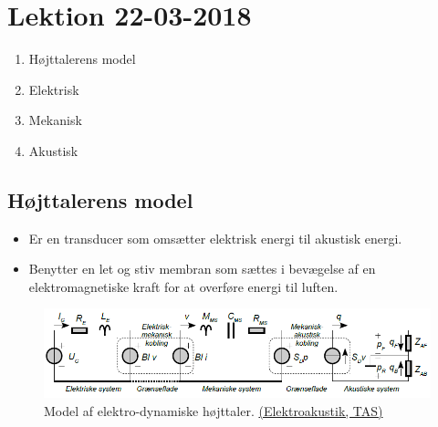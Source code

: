 \section{Lektion 22-03-2018}

\begin{enumerate}
	\item Højttalerens model
	\item Elektrisk
	\item Mekanisk
	\item Akustisk
\end{enumerate}

\noindent{} \vspace{3mm}

\subsection{Højttalerens model}
\begin{itemize}
	\item Er en transducer som omsætter elektrisk energi til akustisk energi.
	\item Benytter en let og stiv membran som sættes i bevægelse af en elektromagnetiske kraft for at overføre energi til luften.
\end{itemize}

\begin{figure} [H]
	\centering
	\includegraphics[width=\linewidth]{graphics/30.png}
	\caption{Model af elektro-dynamiske højttaler. \href{http://www.torean.dk/artikel/Elektroakustik.pdf}{(Elektroakustik, TAS)}}
	\label{fig:30}
\end{figure}

